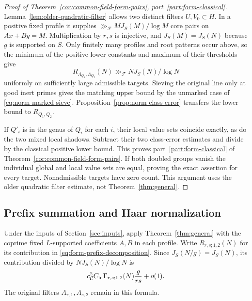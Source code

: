\begin{proof}[Proof of Theorem~\ref{cor:common-field-form-pairs}, part~\ref{part:form-classical}]
Lemma~\ref{lem:older-quadratic-filter} allows two distinct filters
\(U,V_0\subset H\). In a positive fixed profile it supplies
\(\gg_{\mathcal F}MJ_S(M)/\log M\) core pairs on \(Ax+By=M\).
Multiplication by \(r,s\) is injective, and
\(J_S(M)=J_S(N)\) because \(g\) is supported on \(S\). Only finitely
many profiles and root patterns occur above, so the minimum of the
positive lower constants and maximum of their thresholds give
\[
 R_{\Lambda_{Q_1},\Lambda_{Q_2}}(N)
                 \gg_{\mathcal F}NJ_S(N)/\log N
\]
uniformly on sufficiently large admissible targets. Sieving the
original line only at good inert primes gives the matching upper
bound by the unmarked case of \eqref{eq:norm-marked-sieve}.
Proposition~\ref{prop:norm-class-error} transfers the lower bound
to \(R_{Q_1,Q_2}\).

If \(Q'_i\) is in the genus of \(Q_i\) for each \(i\), their local
value sets coincide exactly, as do the two mixed local shadows.
Subtract their two class-error estimates and divide by the classical
positive lower bound. This proves
part~\ref{part:form-classical} of Theorem~\ref{cor:common-field-form-pairs}. If both doubled groups
vanish the individual global and local value sets are equal, proving
the exact assertion for every target. Nonadmissible targets have zero
count. This argument uses the older quadratic filter estimate, not
Theorem~\ref{thm:general}.
\end{proof}

\subsection{Prefix summation and Haar normalization}

Under the inputs of Section~\ref{sec:inputs}, apply
Theorem~\ref{thm:general} with the coprime fixed \(L\)-supported
coefficients \(A,B\) in each profile. Write \(R_{r,s;1,2}(N)\)
for its contribution in \eqref{eq:form-prefix-decomposition}.
Since \(J_S(N/g)=J_S(N)\), its contribution divided by
\(NJ_S(N)/\log N\) is
\begin{equation}\label{eq:norm-prefix-main}
 c_{\mathcal C}^2 C_{\rm in}\Gamma_{r,s;1,2}(N)\frac g{rs}+o(1).
\end{equation}
The original filters \(A_{r,1},A_{s,2}\) remain in this formula.

